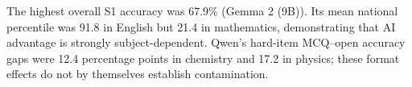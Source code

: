 The highest overall S1 accuracy was 67.9\% (Gemma 2 (9B)). Its mean national percentile was 91.8 in English but 21.4 in mathematics, demonstrating that AI advantage is strongly subject-dependent. Qwen's hard-item MCQ--open accuracy gaps were 12.4 percentage points in chemistry and 17.2 in physics; these format effects do not by themselves establish contamination.
